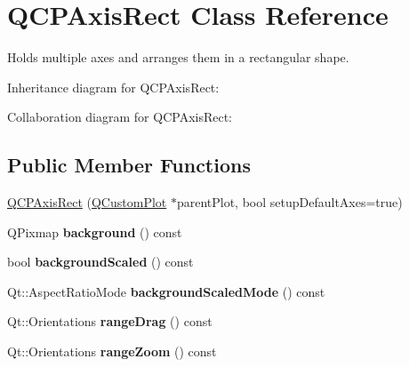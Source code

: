 \hypertarget{class_q_c_p_axis_rect}{}\section{Q\+C\+P\+Axis\+Rect Class Reference}
\label{class_q_c_p_axis_rect}


Holds multiple axes and arranges them in a rectangular shape.  




Inheritance diagram for Q\+C\+P\+Axis\+Rect\+:


Collaboration diagram for Q\+C\+P\+Axis\+Rect\+:
\subsection*{Public Member Functions}
\begin{DoxyCompactItemize}
\item 
\hyperlink{class_q_c_p_axis_rect_a60b31dece805462c1b82eea2e69ba042}{Q\+C\+P\+Axis\+Rect} (\hyperlink{class_q_custom_plot}{Q\+Custom\+Plot} $\ast$parent\+Plot, bool setup\+Default\+Axes=true)
\item 
Q\+Pixmap {\bfseries background} () const \hypertarget{class_q_c_p_axis_rect_a0daa1dadd2a62dbfa37b7f742edd0059}{}\label{class_q_c_p_axis_rect_a0daa1dadd2a62dbfa37b7f742edd0059}

\item 
bool {\bfseries background\+Scaled} () const \hypertarget{class_q_c_p_axis_rect_a67c18777b88fe9c81dee3dd2b5f50e5c}{}\label{class_q_c_p_axis_rect_a67c18777b88fe9c81dee3dd2b5f50e5c}

\item 
Qt\+::\+Aspect\+Ratio\+Mode {\bfseries background\+Scaled\+Mode} () const \hypertarget{class_q_c_p_axis_rect_a3d0f42d6be11a0b3d4576402a2b0032d}{}\label{class_q_c_p_axis_rect_a3d0f42d6be11a0b3d4576402a2b0032d}

\item 
Qt\+::\+Orientations {\bfseries range\+Drag} () const \hypertarget{class_q_c_p_axis_rect_af24b46954ce27a26b23770cdb8319080}{}\label{class_q_c_p_axis_rect_af24b46954ce27a26b23770cdb8319080}

\item 
Qt\+::\+Orientations {\bfseries range\+Zoom} () const \hypertarget{class_q_c_p_axis_rect_a3397fc60e5df29089090bc236e9f05f6}{}\label{class_q_c_p_axis_rect_a3397fc60e5df29089090bc236e9f05f6}


\end{DoxyCompactItemize}
